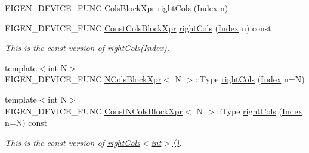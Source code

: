 \begin{DoxyCompactItemize}
E\+I\+G\+E\+N\+\_\+\+D\+E\+V\+I\+C\+E\+\_\+\+F\+U\+NC \mbox{\hyperlink{class_eigen_1_1_block}{Cols\+Block\+Xpr}} \mbox{\hyperlink{class_eigen_1_1_sparse_matrix_base_a394f6ce7117933acc10f32dc55ceee81}{right\+Cols}} (\mbox{\hyperlink{struct_eigen_1_1_eigen_base_a554f30542cc2316add4b1ea0a492ff02}{Index}} n)
\item 
\mbox{\label{class_eigen_1_1_sparse_matrix_base_a0d6ea6a5e895de7b0564ed6ab5c09626}} 
E\+I\+G\+E\+N\+\_\+\+D\+E\+V\+I\+C\+E\+\_\+\+F\+U\+NC \mbox{\hyperlink{class_eigen_1_1_block}{Const\+Cols\+Block\+Xpr}} \mbox{\hyperlink{class_eigen_1_1_sparse_matrix_base_a0d6ea6a5e895de7b0564ed6ab5c09626}{right\+Cols}} (\mbox{\hyperlink{struct_eigen_1_1_eigen_base_a554f30542cc2316add4b1ea0a492ff02}{Index}} n) const
\begin{DoxyCompactList}\small\item\em This is the const version of \mbox{\hyperlink{class_eigen_1_1_sparse_matrix_base_a394f6ce7117933acc10f32dc55ceee81}{right\+Cols(\+Index)}}. \end{DoxyCompactList}\item 
{\footnotesize template$<$int N$>$ }\\E\+I\+G\+E\+N\+\_\+\+D\+E\+V\+I\+C\+E\+\_\+\+F\+U\+NC \mbox{\hyperlink{struct_eigen_1_1_sparse_matrix_base_1_1_n_cols_block_xpr}{N\+Cols\+Block\+Xpr}}$<$ N $>$\+::Type \mbox{\hyperlink{class_eigen_1_1_sparse_matrix_base_ad70dcf0cacd45a752f47aa3adc6444d9}{right\+Cols}} (\mbox{\hyperlink{struct_eigen_1_1_eigen_base_a554f30542cc2316add4b1ea0a492ff02}{Index}} n=N)
\item 
\mbox{\label{class_eigen_1_1_sparse_matrix_base_a489c101cfd6f363cdb3830a3d9655637}} 
{\footnotesize template$<$int N$>$ }\\E\+I\+G\+E\+N\+\_\+\+D\+E\+V\+I\+C\+E\+\_\+\+F\+U\+NC \mbox{\hyperlink{struct_eigen_1_1_sparse_matrix_base_1_1_const_n_cols_block_xpr}{Const\+N\+Cols\+Block\+Xpr}}$<$ N $>$\+::Type \mbox{\hyperlink{class_eigen_1_1_sparse_matrix_base_a489c101cfd6f363cdb3830a3d9655637}{right\+Cols}} (\mbox{\hyperlink{struct_eigen_1_1_eigen_base_a554f30542cc2316add4b1ea0a492ff02}{Index}} n=N) const
\begin{DoxyCompactList}\small\item\em This is the const version of \mbox{\hyperlink{class_eigen_1_1_sparse_matrix_base_a394f6ce7117933acc10f32dc55ceee81}{right\+Cols$<$int$>$()}}. \end{DoxyCompactList}\item 

\end{DoxyCompactItemize}
